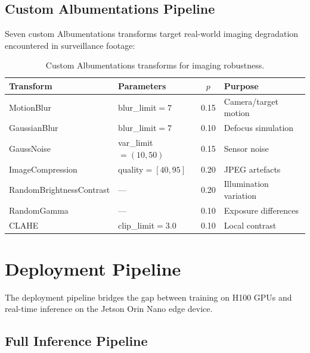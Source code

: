 \documentclass[12pt, titlepage]{article}
\begin{document}
\subsection{Custom Albumentations Pipeline}
\label{sec:albumentations}

Seven custom Albumentations transforms target real-world imaging degradation
encountered in surveillance footage:

\begin{table}[H]
  \centering
  \caption{Custom Albumentations transforms for imaging robustness.}
  \label{tab:albumentations}
  \small
  \begin{tabular}{@{}llcl@{}}
    \toprule
    \textbf{Transform}       & \textbf{Parameters}   & \textbf{$p$} & \textbf{Purpose}       \\
    \midrule
    MotionBlur               & blur\_limit$=7$       & 0.15         & Camera/target motion   \\
    GaussianBlur             & blur\_limit$=7$       & 0.10         & Defocus simulation     \\
    GaussNoise               & var\_limit$=(10, 50)$ & 0.15         & Sensor noise           \\
    ImageCompression         & quality$=[40, 95]$    & 0.20         & JPEG artefacts         \\
    RandomBrightnessContrast & ---                   & 0.20         & Illumination variation \\
    RandomGamma              & ---                   & 0.10         & Exposure differences   \\
    CLAHE                    & clip\_limit$=3.0$     & 0.10         & Local contrast         \\
    \bottomrule
  \end{tabular}
\end{table}

\section{Deployment Pipeline}
\label{sec:deployment}

The deployment pipeline bridges the gap between training on H100 GPUs and
real-time inference on the Jetson Orin Nano edge device.

\subsection{Full Inference Pipeline}
\label{sec:full_pipeline}
\end{document}
